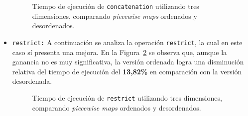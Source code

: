\begin{itemize}
   \begin{figure}[htbp]
          \centering
          \caption{Tiempo de ejecución de \texttt{concatenation} utilizando tres dimensiones, comparando \textit{piecewise maps} ordenados y desordenados.}
          \label{fig:Ren-compo-3d}
        \end{figure}

           \item \texttt{restrict:} 
            A continuación se analiza la operación \texttt{restrict}, la cual en este caso 
            sí presenta una mejora. En la Figura~\ref{fig:Ren-rest-3d} se observa que, 
            aunque la ganancia no es muy significativa, la versión ordenada logra una 
            disminución relativa del tiempo de ejecución del \textbf{13{,}82\%} en comparación 
            con la versión desordenada.



   \begin{figure}[htbp]
          \centering
          \caption{Tiempo de ejecución de \texttt{restrict} utilizando tres dimensiones, comparando \textit{piecewise maps} ordenados y desordenados.}
          \label{fig:Ren-rest-3d}
        \end{figure}


\end{itemize}
